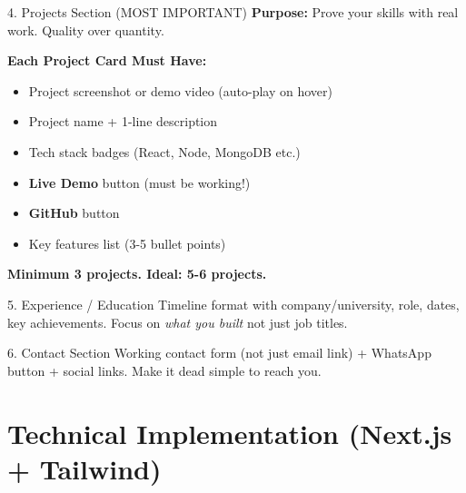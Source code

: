 \documentclass[12pt,a4paper]{article}
\begin{document}
\vspace{0.4cm}

\begin{sectionbox}{4. Projects Section (MOST IMPORTANT)}
\textbf{Purpose:} Prove your skills with real work. Quality over quantity.

\vspace{0.3cm}
\textbf{Each Project Card Must Have:}
\begin{itemize}[leftmargin=1.5em, itemsep=3pt]
    \item[\ding{62}] Project screenshot or demo video (auto-play on hover)
    \item[\ding{62}] Project name + 1-line description
    \item[\ding{62}] Tech stack badges (React, Node, MongoDB etc.)
    \item[\ding{62}] \textbf{Live Demo} button (must be working!)
    \item[\ding{62}] \textbf{GitHub} button
    \item[\ding{62}] Key features list (3-5 bullet points)
\end{itemize}

\vspace{0.3cm}
\textbf{Minimum 3 projects. Ideal: 5-6 projects.}
\end{sectionbox}

\vspace{0.4cm}

\begin{sectionbox}{5. Experience / Education}
Timeline format with company/university, role, dates, key achievements. Focus on \textit{what you built} not just job titles.
\end{sectionbox}

\vspace{0.4cm}

\begin{sectionbox}{6. Contact Section}
Working contact form (not just email link) + WhatsApp button + social links. Make it dead simple to reach you.
\end{sectionbox}

\newpage

\section{Technical Implementation (Next.js + Tailwind)}
\end{document}
